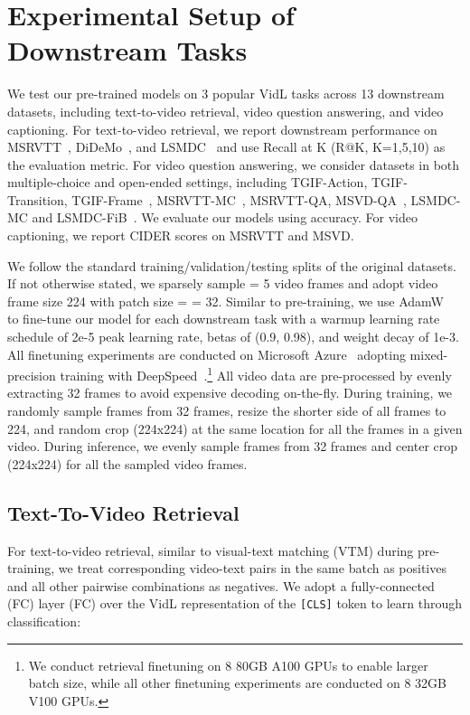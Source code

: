 \documentclass[10pt,twocolumn,letterpaper]{article}
\begin{document}
\section{Experimental Setup of Downstream Tasks}
We test our pre-trained models on 3 popular VidL tasks across 13 downstream datasets, including text-to-video retrieval, video question answering, and video captioning. For text-to-video retrieval, we report downstream performance on MSRVTT~\cite{xu2016msrvtt}, DiDeMo~\cite{hendricks2017didemo}, and LSMDC~\cite{rohrbach2015lsmdc} and use Recall at K (R@K, K=1,5,10) as the evaluation metric. For video question answering, we consider datasets in both multiple-choice and open-ended settings, including TGIF-Action, TGIF-Transition, TGIF-Frame~\cite{jang2017tgif-qa}, MSRVTT-MC~\cite{yu2018js-fusion}, MSRVTT-QA, MSVD-QA~\cite{xu2017msrvtt-qa}, LSMDC-MC and LSMDC-FiB~\cite{torabi2016lsmdc-fib}. We evaluate our models using accuracy. For video captioning, we report CIDER scores on MSRVTT and MSVD. 

We follow the standard training/validation/testing splits of the original datasets. If not otherwise stated, we sparsely sample  = 5  video frames and adopt video frame size 224 with patch size  =  = 32. Similar to pre-training, we use AdamW~\cite{loshchilov2019adamw} to fine-tune our model for each downstream task with a warmup learning rate schedule of 2e-5 peak learning rate, betas of (0.9, 0.98), and weight decay of 1e-3. All finetuning experiments are conducted on Microsoft Azure~\cite{msft-azure} adopting mixed-precision training with DeepSpeed~\cite{rasley2020deepspeed}.\footnote{We conduct retrieval finetuning on 8 80GB A100 GPUs to enable larger batch size, while all other finetuning experiments are conducted on 8 32GB V100 GPUs.} All video data are pre-processed by evenly extracting 32 frames to avoid expensive decoding on-the-fly. During training, we randomly sample  frames from 32 frames, resize the shorter side of all frames to 224, and random crop (224x224) at the same location for all the frames in a given video. During inference, we evenly sample  frames from 32 frames and center crop (224x224) for all the sampled video frames. 

\subsection{Text-To-Video Retrieval}
For text-to-video retrieval, similar to visual-text matching (VTM) during pre-training, we treat corresponding video-text pairs in the same batch as positives and all other pairwise combinations as negatives. We adopt a fully-connected (FC) layer (FC) over the VidL representation  of the \texttt{[CLS]} token to learn through classification:
\vspace{4pt}
\end{document}
